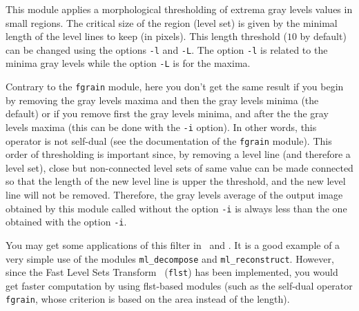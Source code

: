 This module applies a morphological thresholding of extrema gray levels values
in small regions.
The critical size of the region (level set) is given by the minimal length of 
the level lines to keep (in pixels).
This length threshold ($10$ by default) can be changed using the options
\verb+-l+ and \verb+-L+.
The option \verb+-l+ is related to the minima gray levels while the option
\verb+-L+ is for the maxima.

Contrary to the \verb+fgrain+ module, here 
you don't get the same result if you begin by removing the gray levels maxima
and then the gray levels minima (the default) or if you remove first the
gray levels minima, and after the the gray levels maxima (this can be done
with the \verb+-i+ option). In other words, this operator is not self-dual
(see the documentation of the \verb+fgrain+ module).
This order of thresholding is important since, by removing a level
line (and therefore a level set), close but non-connected level sets of same 
value can be made connected so that the length of the new level line is upper
the threshold, and the new level line will not be removed.
Therefore, the gray levels average of the output image obtained by this
module called without the option \verb+-i+ is always less than the 
one obtained with the option \verb+-i+.

You may get some applications of this filter in~\cite{froment:perceptible}
and \cite{froment:functional}.
It is a good example of a very simple use of the modules \verb+ml_decompose+ and
\verb+ml_reconstruct+. However, since the Fast Level Sets 
Transform~\cite{monasse.guichard:fast} (\verb+flst+) has been implemented, 
you would get faster computation by using flst-based modules 
(such as the self-dual operator \verb+fgrain+, whose criterion is
based on the area instead of the length).

